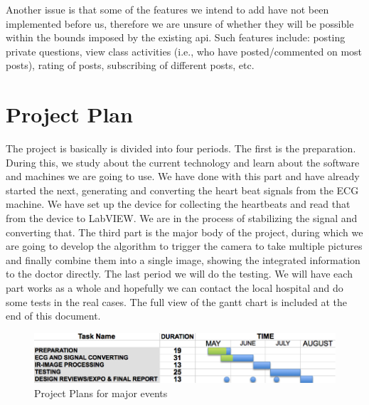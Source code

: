 \documentclass[paper=letter, fontsize=11pt]{scrartcl}
\numberwithin{equation}{section}		%
\numberwithin{figure}{section}			%
\numberwithin{table}{section}			%
\begin{document}
Another issue is that some of the features we intend to add have not been implemented before us, therefore we are unsure of whether they will be possible within the bounds imposed by the existing api. Such features include: posting private questions, view class activities (i.e., who have posted/commented on most posts), rating of posts, subscribing of different posts, etc.

\section{Project Plan}
The project is basically is divided into four periods. The first is the preparation. During this, we study about the current technology and learn about the software and machines we are going to use.  We have done with this part and have already started the next, generating and converting the heart beat signals from the ECG machine. We have set up the device for collecting the heartbeats and read that from the device to LabVIEW. We are in the process of stabilizing the signal and converting that. The third part is the major body of the project, during which we are going to develop the algorithm to trigger the camera to take multiple pictures and finally combine them into a single image, showing the integrated information to the doctor directly.  The last period we will do the testing. We will have each part works as a whole and hopefully we can contact the local hospital and do some tests in the real cases.
The full view of the gantt chart is included at the end of this document.
\begin{figure}[H]
	\centering
	\includegraphics[scale=1]{pjp}
	\caption{Project Plans for major events}
\end{figure}
\end{document}
